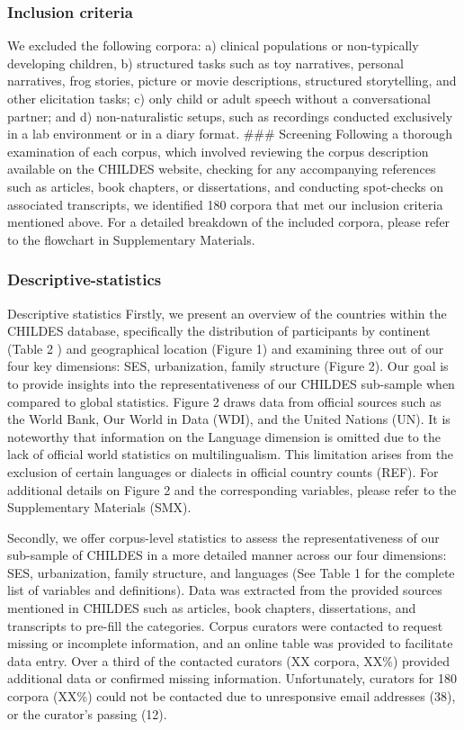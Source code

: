 \documentclass[
  man,floatsintext]{apa6}
\begin{document}
\hypertarget{inclusion-criteria}{%
\subsubsection{Inclusion criteria}\label{inclusion-criteria}}

We excluded the following corpora: a) clinical populations or non-typically developing children, b) structured tasks such as toy narratives, personal narratives, frog stories, picture or movie descriptions, structured storytelling, and other elicitation tasks; c) only child or adult speech without a conversational partner; and d) non-naturalistic setups, such as recordings conducted exclusively in a lab environment or in a diary format.
\#\#\# Screening
Following a thorough examination of each corpus, which involved reviewing the corpus description available on the CHILDES website, checking for any accompanying references such as articles, book chapters, or dissertations, and conducting spot-checks on associated transcripts, we identified 180 corpora that met our inclusion criteria mentioned above. For a detailed breakdown of the included corpora, please refer to the flowchart in Supplementary Materials.

\hypertarget{descriptive-statistics}{%
\subsubsection{Descriptive-statistics}\label{descriptive-statistics}}

Descriptive statistics
Firstly, we present an overview of the countries within the CHILDES database, specifically the distribution of participants by continent (Table 2 ) and geographical location (Figure 1) and examining three out of our four key dimensions: SES, urbanization, family structure (Figure 2). Our goal is to provide insights into the representativeness of our CHILDES sub-sample when compared to global statistics. Figure 2 draws data from official sources such as the World Bank, Our World in Data (WDI), and the United Nations (UN). It is noteworthy that information on the Language dimension is omitted due to the lack of official world statistics on multilingualism. This limitation arises from the exclusion of certain languages or dialects in official country counts (REF). For additional details on Figure 2 and the corresponding variables, please refer to the Supplementary Materials (SMX).

Secondly, we offer corpus-level statistics to assess the representativeness of our sub-sample of CHILDES in a more detailed manner across our four dimensions: SES, urbanization, family structure, and languages (See Table 1 for the complete list of variables and definitions).
Data was extracted from the provided sources mentioned in CHILDES such as articles, book chapters, dissertations, and transcripts to pre-fill the categories. Corpus curators were contacted to request missing or incomplete information, and an online table was provided to facilitate data entry. Over a third of the contacted curators (XX corpora, XX\%) provided additional data or confirmed missing information. Unfortunately, curators for 180 corpora (XX\%) could not be contacted due to unresponsive email addresses (38), or the curator's passing (12).
\end{document}
